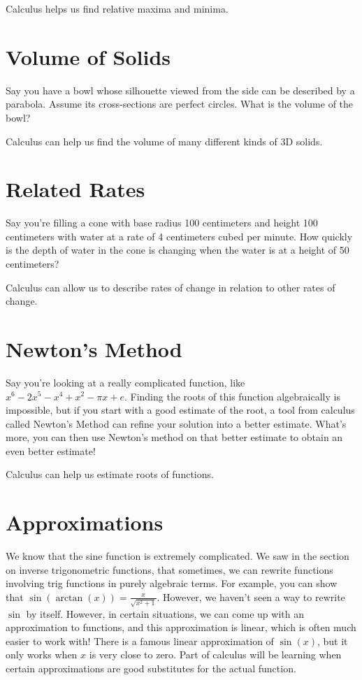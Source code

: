 \documentclass{ximera}
\begin{document}
Calculus helps us find relative maxima and minima.

\section{Volume of Solids}
Say you have a bowl whose silhouette viewed from the side can be described by a parabola. Assume its cross-sections are perfect circles. What is the volume of the bowl? 

Calculus can help us find the volume of many different kinds of 3D solids. 

\section{Related Rates}
Say you're filling a cone with base radius 100 centimeters and height 100 centimeters with water at a rate of 4 centimeters cubed per minute. How quickly is the depth of water in the cone is changing when the water is at a height of 50 centimeters? 

Calculus can allow us to describe rates of change in relation to other rates of change. 

\section{Newton's Method}
Say you're looking at a really complicated function, like $x^6 - 2x^5 - x^4 + x^2 - \pi x + e$. Finding the roots of this function algebraically is impossible, but if you start with a good estimate of the root, a tool from calculus called Newton's Method can refine your solution into a better estimate. What's more, you can then use Newton's method on that better estimate to obtain an even better estimate!

Calculus can help us estimate roots of functions. 

\section{Approximations}
We know that the sine function is extremely complicated. We saw in the section on inverse trigonometric functions, that sometimes, we can rewrite functions involving trig functions in purely algebraic terms. For example, you can show that $\sin(\arctan(x)) = \frac{x}{\sqrt{x^2 + 1}}$. However, we haven't seen a way to rewrite $\sin$ by itself. However, in certain situations, we can come up with an approximation to functions, and this approximation is linear, which is often much easier to work with! There is a famous linear approximation of $\sin(x)$, but it only works when $x$ is very close to zero. Part of calculus will be learning when certain approximations are good substitutes for the actual function.
\end{document}
